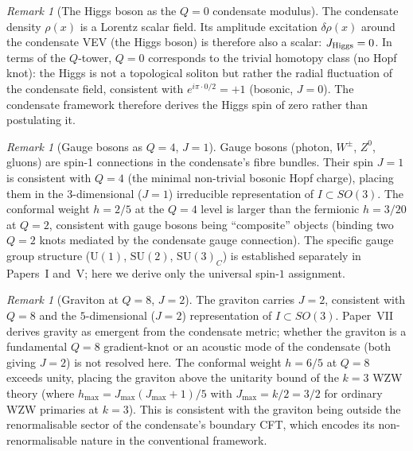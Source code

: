 \documentclass[11pt,a4paper]{article}
\theoremstyle{definition}
\theoremstyle{remark}
\newtheorem{remark}[theorem]{Remark}
\begin{document}
\begin{remark}[The Higgs boson as the $Q=0$ condensate modulus]
\label{P13:rem:higgs_q0}
The condensate density $\rho(x)$ is a Lorentz scalar field.
Its amplitude excitation $\delta\rho(x)$ around the condensate VEV
(the Higgs boson) is therefore also a scalar: $J_{\rm Higgs}=0$.
In terms of the $Q$-tower, $Q=0$ corresponds to the trivial homotopy
class (no Hopf knot): the Higgs is not a topological soliton but rather
the radial fluctuation of the condensate field, consistent with
$e^{i\pi\cdot0/2} = +1$ (bosonic, $J=0$).
The condensate framework therefore derives the Higgs spin of zero rather
than postulating it.
\end{remark}

\begin{remark}[Gauge bosons as $Q=4$, $J=1$]
\label{P13:rem:gauge_q4}
Gauge bosons (photon, $W^\pm$, $Z^0$, gluons) are spin-1 connections
in the condensate's fibre bundles.
Their spin $J=1$ is consistent with $Q=4$ (the minimal non-trivial bosonic
Hopf charge), placing them in the $3$-dimensional ($J=1$) irreducible
representation of $I\subset SO(3)$.
The conformal weight $h=2/5$ at the $Q=4$ level is larger than the
fermionic $h=3/20$ at $Q=2$, consistent with gauge bosons being
``composite'' objects (binding two $Q=2$ knots mediated by the
condensate gauge connection).
The specific gauge group structure ($\mathrm{U}(1)$, $\mathrm{SU}(2)$,
$\mathrm{SU}(3)_C$) is established separately in Papers~I and~V;
here we derive only the universal spin-$1$ assignment.
\end{remark}

\begin{remark}[Graviton at $Q=8$, $J=2$]
\label{P13:rem:graviton_q8}
The graviton carries $J=2$, consistent with $Q=8$ and the
$5$-dimensional ($J=2$) representation of $I\subset SO(3)$.
Paper~VII~\cite{Paper7} derives gravity as emergent from the condensate
metric; whether the graviton is a fundamental $Q=8$ gradient-knot or
an acoustic mode of the condensate (both giving $J=2$) is not
resolved here.
The conformal weight $h=6/5$ at $Q=8$ exceeds unity, placing
the graviton above the unitarity bound of the $k=3$ WZW theory
(where $h_{\max}=J_{\max}(J_{\max}+1)/5$ with $J_{\max}=k/2=3/2$ for
ordinary WZW primaries at $k=3$).
This is consistent with the graviton being outside the renormalisable
sector of the condensate's boundary CFT, which encodes its
non-renormalisable nature in the conventional framework.
\end{remark}
\end{document}
